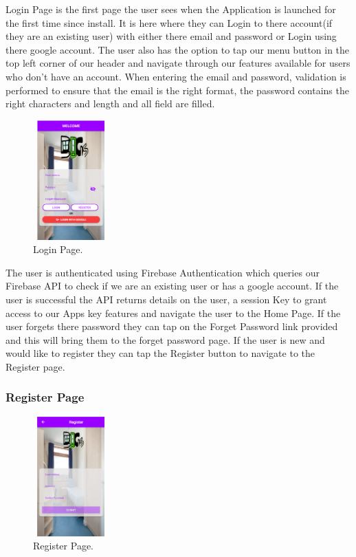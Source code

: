 Login Page is the first page the user sees when the Application is launched for the first time since install. It is here where they can Login to there account(if they are an existing user) with either there email and password or Login using there google account. The user also has the option to tap our menu button in the top left corner of our header and navigate through our features available for users who don’t have an account.  When entering the email and password, validation is performed to ensure that the email is the right format, the password contains the right characters and length and all field are filled.  

\begin{figure}[h]
\centering
\includegraphics[width=2.9cm, height=4.6cm]{img/Login}
\caption{Login Page.}
\end{figure}

\noindent The user is authenticated using Firebase Authentication which queries our Firebase API to check if we are an existing user or has a google account. If the user is successful the API returns details on the user, a session Key to grant access to our Apps key features and navigate the user to the Home Page. If the user forgets there password they can tap on the Forget Password link provided and this will bring them to the forget password page. If the user is new and would like to register they can tap the Register button to navigate to the Register page. 

\subsubsection{Register Page}

\begin{figure}[h]
\centering
\includegraphics[width=2.9cm, height=4.6cm]{img/Register}
\caption{Register Page.}
\end{figure}

